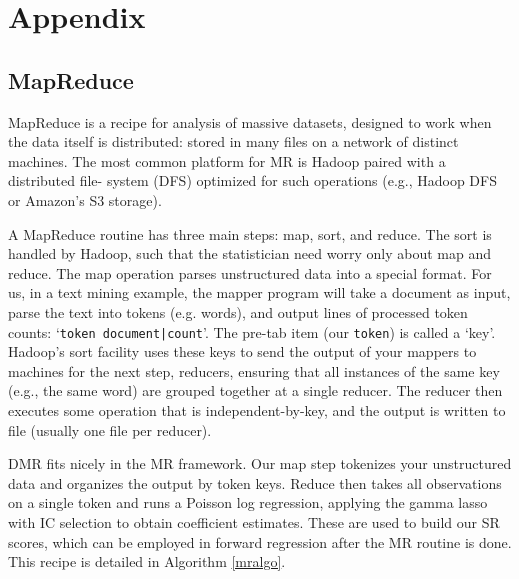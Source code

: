 \documentclass[12pt]{article}
\newcommand{\cd}[1]{{\tt#1}}
\begin{document}
\appendix
\section{Appendix}

\subsection{MapReduce} 
\label{MR}

  MapReduce \citep[MR;][]{dean_mapreduce:_2004} is a  recipe
for analysis of massive datasets, designed to work when the data itself is
distributed: stored in many files on a network of distinct machines.
The most common platform for  MR is Hadoop paired with a distributed file-
system (DFS)  optimized for such operations (e.g., Hadoop DFS or
Amazon's S3 storage).

A MapReduce routine has three main steps: map, sort, and reduce.  The sort  is handled by 
Hadoop, such that the statistician need worry only about map and reduce.  The map operation parses  unstructured data into a special format.  For us, in a text mining example, the mapper program will take a document as input, parse the text into tokens (e.g. words), and output lines of processed token counts: `\cd{token   document|count}'.  The pre-tab item (our \cd{token}) is called a `key'.  Hadoop's sort facility uses these keys to send the output of your mappers to machines for the next step, reducers, ensuring that all instances of the same key (e.g., the same word) are grouped together at a single reducer.  The reducer then executes some operation that is independent-by-key, and the output is written to file (usually one file per reducer).

DMR fits nicely in the MR framework.  Our map step tokenizes your unstructured data  and organizes the output by token keys.  Reduce then takes all observations on a single token and runs a Poisson log regression, applying the gamma lasso with IC selection to obtain coefficient estimates.  These are used to build our SR scores, which can be employed in forward regression after the MR routine is done.  This recipe is detailed in Algorithm \ref{mralgo}.
\end{document}
